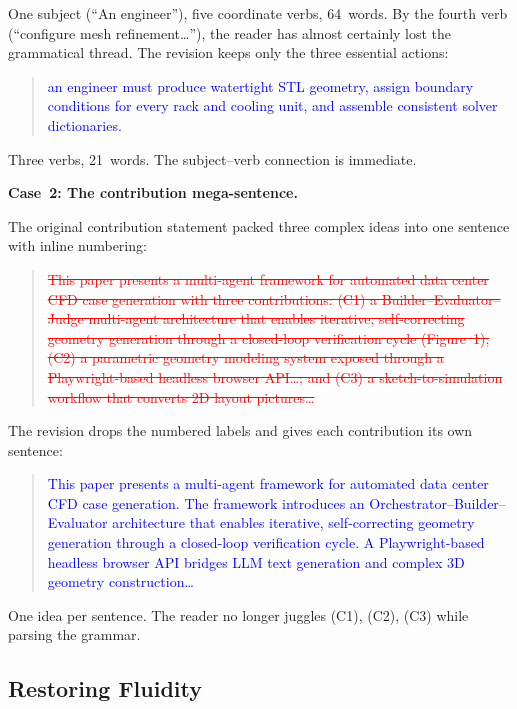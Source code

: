 \documentclass[journal]{IEEEtran}
\newcommand{\revdel}[1]{\textcolor{red}{\sout{#1}}}
\newcommand{\revadd}[1]{\textcolor{blue}{#1}}
\begin{document}
\noindent One subject (``An engineer''), five coordinate verbs, 64~words. By the fourth verb (``configure mesh refinement\ldots''), the reader has almost certainly lost the grammatical thread. The revision keeps only the three essential actions:

\begin{quote}
\revadd{an engineer must produce watertight STL geometry, assign boundary conditions for every rack and cooling unit, and assemble consistent solver dictionaries.}
\end{quote}

\noindent Three verbs, 21~words. The subject--verb connection is immediate.

\medskip

\textbf{Case~2: The contribution mega-sentence.}

The original contribution statement packed three complex ideas into one sentence with inline numbering:

\begin{quote}
\revdel{This paper presents a multi-agent framework for automated data center CFD case generation with three contributions: (C1) a Builder--Evaluator--Judge multi-agent architecture that enables iterative, self-correcting geometry generation through a closed-loop verification cycle (Figure~1); (C2) a parametric geometry modeling system exposed through a Playwright-based headless browser API\ldots; and (C3) a sketch-to-simulation workflow that converts 2D layout pictures\ldots}
\end{quote}

\noindent The revision drops the numbered labels and gives each contribution its own sentence:

\begin{quote}
\revadd{This paper presents a multi-agent framework for automated data center CFD case generation. The framework introduces an Orchestrator--Builder--Evaluator architecture that enables iterative, self-correcting geometry generation through a closed-loop verification cycle. A Playwright-based headless browser API bridges LLM text generation and complex 3D geometry construction\ldots}
\end{quote}

\noindent One idea per sentence. The reader no longer juggles (C1), (C2), (C3) while parsing the grammar.

\subsection{Restoring Fluidity}
\end{document}
